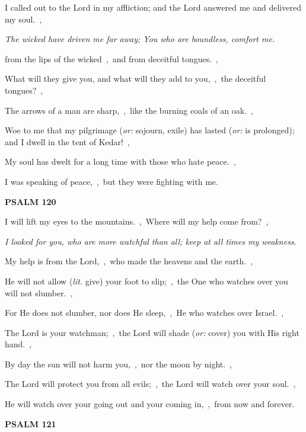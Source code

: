 \documentclass[12pt,twoside,a5paper]{article}
\newcommand{\psalm}[1]{\textbf{PSALM {#1}}\nopagebreak}
\newcommand{\qanona}[1]{{\liturgicalhint{Qanona.} \emph{#1}}}
\newcommand{\translationoption}[1]{\emph{or:} #1}
\newcommand{\translationliteral}[1]{\emph{lit.} #1}
\begin{document}
\begin{normalparskip}
  I called out to the Lord in my affliction; and the Lord answered me and delivered my soul.~\sep

  \qanona{The wicked have driven me far away; You who are boundless, comfort me.}

  from the lips of the wicked~\sep\ and from deceitful tongues.~\sep

  What will they give you, and what will they add to you,~\sep\ the deceitful tongues?~\sep

  The arrows of a man are sharp,~\sep\ like the burning coals of an oak.~\sep

  Woe to me that my pilgrimage (\translationoption{sojourn, exile}) has lasted (\translationoption{is prolonged}); and I dwell in the tent of Kedar!~\sep

  My soul has dwelt for a long time with those who hate peace.~\sep

  I was speaking of peace,~\sep\ but they were fighting with me.
\end{normalparskip}

\psalm{120}

\begin{normalparskip}
  I will lift my eyes to the mountains.~\sep\ Where will my help come from?~\sep

  \qanona{I looked for you, who are more watchful than all; keep at all times my weakness.}

  My help is from the Lord,~\sep\ who made the heavens and the earth.~\sep

  He will not allow (\translationliteral{give}) your foot to slip;~\sep\ the One who watches over you will not slumber.~\sep

  For He does not slumber, nor does He sleep,~\sep\ He who watches over Israel.~\sep

  The Lord is your watchman;~\sep\ the Lord will shade (\translationoption{cover}) you with His right hand.~\sep

  By day the sun will not harm you,~\sep\ nor the moon by night.~\sep

  The Lord will protect you from all evils;~\sep\ the Lord will watch over your soul.~\sep

  He will watch over your going out and your coming in,~\sep\ from now and forever.
\end{normalparskip}

\psalm{121}
\end{document}
